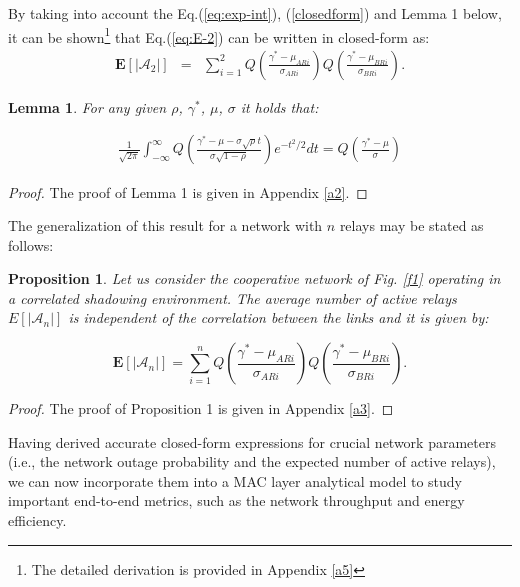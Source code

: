 \documentclass[12pt,draftcls, onecolumn]{IEEEtran}
\newtheorem{proposition}{Proposition}
\newtheorem{lemma}{Lemma}
\begin{document}
\vspace{-1pt}

By taking into account the Eq.(\ref{eq:exp-int}), (\ref{closedform}) and Lemma 1 below, it can be shown\footnote{The detailed derivation is provided in Appendix \ref{a5}} that Eq.(\ref{eq:E-2}) can be written in closed-form as:
\vspace{-1pt}
\begingroup
\begin{eqnarray}
\mathbf{E}\left[\left|\mathcal{A}_2\right|\right] &=& \sum^2_{i=1} Q\left(\frac{\gamma^* - \mu_{ARi}}{\sigma_{ARi}}\right)Q\left(\frac{\gamma^* - \mu_{{BRi}}}{\sigma_{{BRi}}}\right)\label{eq:average2}.
\end{eqnarray}
\endgroup

\begin{lemma}
For any given $\rho$, $\gamma^*$, $\mu$, $\sigma$ it holds that:

\begingroup
\begin{eqnarray}
\frac{1}{\sqrt{2\pi}}\int^{\infty}_{-\infty}Q\left(\frac{\gamma^* - \mu-\sigma \sqrt{\rho} t}{\sigma\sqrt{1-\rho}}\right)e^{-t^2/2} dt
=Q\left(\frac{\gamma^* - \mu}{\sigma}\right)
\end{eqnarray}
\endgroup
\end{lemma}
\begin{proof}
The proof of Lemma 1 is given in Appendix \ref{a2}.
\end{proof}

\noindent The generalization of this result for a network with $n$ relays may be stated as follows:

\begin{proposition}
Let us consider the cooperative network of Fig. \ref{f1} operating in a correlated shadowing environment. The average number of active relays $E\left[\left|\mathcal{A}_n\right|\right]$ is independent of the correlation between the links and it is given by:

\begingroup
\begin{equation}
\mathbf{E}\left[\left|\mathcal{A}_n\right|\right] {=} \sum^n_{i=1} Q\left(\frac{\gamma^* - \mu_{ARi}}{\sigma_{ARi}}\right)Q\left(\frac{\gamma^* - \mu_{{BRi}}}{\sigma_{{BRi}}}\right).
\label{eq:Average}
\end{equation}
\endgroup
\end{proposition}
\begin{proof}
The proof of Proposition 1 is given in Appendix \ref{a3}.
\end{proof}

Having derived accurate closed-form expressions for crucial network parameters (i.e., the network outage probability and the expected number of active relays), we can now incorporate them into a MAC layer analytical model to study important end-to-end metrics, such as the network throughput and energy efficiency.
\end{document}
